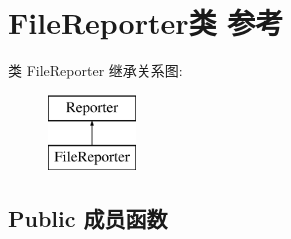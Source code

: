 \hypertarget{class_file_reporter}{}\section{File\+Reporter类 参考}
\label{class_file_reporter}
类 File\+Reporter 继承关系图\+:\begin{figure}[H]
\begin{center}
\leavevmode
\includegraphics[height=2.000000cm]{class_file_reporter}
\end{center}
\end{figure}
\subsection*{Public 成员函数}
